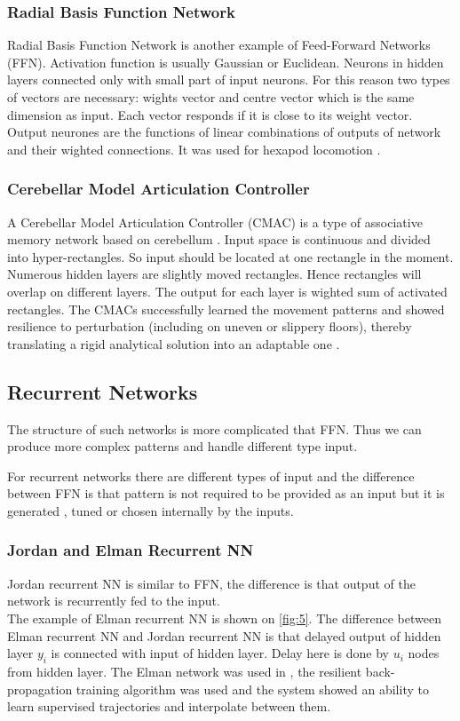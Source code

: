\documentclass[12pt,a4paper]{report}
\begin{document}
				\subsubsection{Radial Basis Function Network}
					Radial Basis Function Network is another example of Feed-Forward Networks (FFN). Activation function is usually Gaussian or Euclidean. Neurons in hidden layers connected only with small part of input neurons. For this reason two types of vectors are necessary: wights vector and centre vector which is the same dimension as input. Each vector responds if it is close to its weight vector. Output neurones are the functions of linear combinations of outputs of network and their wighted connections.
					It was used for hexapod locomotion \cite{ilg1995learning}.
				\subsubsection{Cerebellar Model Articulation Controller}
					A Cerebellar Model Articulation Controller (CMAC) is a type of associative memory network based on cerebellum \cite{albus1975new}. Input space is continuous and divided into hyper-rectangles. So input should be located at one rectangle in the moment. Numerous hidden layers are slightly moved rectangles. Hence rectangles will overlap on different layers. The output for each layer is wighted sum of activated rectangles. The CMACs successfully learned the movement patterns and showed resilience to perturbation (including on uneven or slippery floors), thereby translating a rigid analytical solution into an adaptable one \cite{sabourin2005robustness}.
			\subsection{Recurrent Networks}
				The structure of such networks is more complicated that FFN. Thus we can produce more complex patterns and handle different type input.
				
				For recurrent networks there are different types of input and the difference between FFN is that pattern is not required to be provided as an input but it is generated , tuned or chosen internally by the inputs. 
				
				\subsubsection{Jordan and Elman Recurrent NN}
					Jordan recurrent NN is similar to FFN, the difference is that output of the network is recurrently fed to the input.\\
					The example of Elman recurrent NN is shown on \ref{fig:5}. The difference between Elman recurrent NN and Jordan recurrent NN is that delayed output of hidden layer $y_i$ is connected with input of hidden layer. Delay here is done by $u_i$ nodes from hidden layer. The Elman network was used in \cite{berns1995neural}, the resilient back-propagation training algorithm was used and the system showed an ability to learn supervised trajectories and interpolate between them.
					
\end{document}
